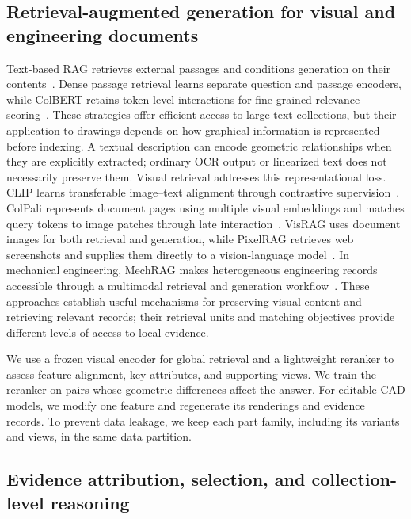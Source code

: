 \documentclass[preprint,12pt]{elsarticle}
\begin{document}
\subsection{Retrieval-augmented generation for visual and engineering documents}
\label{sec:related_retrieval}

Text-based RAG retrieves external passages and conditions generation on their contents~\cite{lewis2020rag}. Dense passage retrieval learns separate question and passage encoders, while ColBERT retains token-level interactions for fine-grained relevance scoring~\cite{karpukhin2020dpr,khattab2020colbert}. These strategies offer efficient access to large text collections, but their application to drawings depends on how graphical information is represented before indexing. A textual description can encode geometric relationships when they are explicitly extracted; ordinary OCR output or linearized text does not necessarily preserve them. Visual retrieval addresses this representational loss. CLIP learns transferable image--text alignment through contrastive supervision~\cite{radford2021clip}. ColPali represents document pages using multiple visual embeddings and matches query tokens to image patches through late interaction~\cite{faysse2024colpali}. VisRAG uses document images for both retrieval and generation, while PixelRAG retrieves web screenshots and supplies them directly to a vision-language model~\cite{yu2024visrag,wang2026pixelrag}. In mechanical engineering, MechRAG makes heterogeneous engineering records accessible through a multimodal retrieval and generation workflow~\cite{li2025mechrag}. These approaches establish useful mechanisms for preserving visual content and retrieving relevant records; their retrieval units and matching objectives provide different levels of access to local evidence.

We use a frozen visual encoder for global retrieval and a lightweight reranker to assess feature alignment, key attributes, and supporting views. We train the reranker on pairs whose geometric differences affect the answer. For editable CAD models, we modify one feature and regenerate its renderings and evidence records. To prevent data leakage, we keep each part family, including its variants and views, in the same data partition.

\subsection{Evidence attribution, selection, and collection-level reasoning}
\label{sec:related_evidence}
\end{document}
